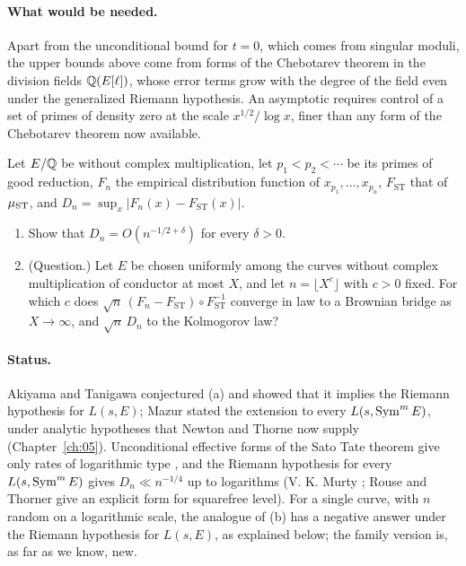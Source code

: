 \paragraph{What would be needed.} Apart from the unconditional bound for $t=0$, which comes from singular moduli, the upper bounds above come from forms of the Chebotarev theorem in the division fields $\mathbb{Q}(E[\ell])$, whose error terms grow with the degree of the field even under the generalized Riemann hypothesis. An asymptotic requires control of a set of primes of density zero at the scale $x^{1/2}/\log x$, finer than any form of the Chebotarev theorem now available.

\begin{problem}\label{op:disc}
Let $E/\mathbb{Q}$ be without complex multiplication, let $p_1<p_2<\cdots$ be its primes of good reduction, $F_n$ the empirical distribution function of $x_{p_1},\dots,x_{p_n}$, $F_{\mathrm{ST}}$ that of $\mu_{\mathrm{ST}}$, and $D_n=\sup_x|F_n(x)-F_{\mathrm{ST}}(x)|$.
\begin{enumerate}[label=(\alph*)]
\item Show that $D_n=O(n^{-1/2+\delta})$ for every $\delta>0$.
\item (Question.) Let $E$ be chosen uniformly among the curves without complex multiplication of conductor at most $X$, and let $n=\lfloor X^c\rfloor$ with $c>0$ fixed. For which $c$ does $\sqrt n\,(F_n-F_{\mathrm{ST}})\circ F_{\mathrm{ST}}^{-1}$ converge in law to a Brownian bridge as $X\to\infty$, and $\sqrt n\,D_n$ to the Kolmogorov law?
\end{enumerate}
\end{problem}

\paragraph{Status.} Akiyama and Tanigawa \cite{akiyamatanigawa1999} conjectured (a) and showed that it implies the Riemann hypothesis for $L(s,E)$; Mazur \cite{mazur2008} stated the extension to every $L(s,\operatorname{Sym}^mE)$, under analytic hypotheses that Newton and Thorne now supply (Chapter~\ref{ch:05}). Unconditional effective forms of the Sato Tate theorem give only rates of logarithmic type \cite{thorner2021}, and the Riemann hypothesis for every $L(s,\operatorname{Sym}^mE)$ gives $D_n\ll n^{-1/4}$ up to logarithms (V. K. Murty \cite{murty1985}; Rouse and Thorner \cite{rousethorner2017} give an explicit form for squarefree level). For a single curve, with $n$ random on a logarithmic scale, the analogue of (b) has a negative answer under the Riemann hypothesis for $L(s,E)$, as explained below; the family version is, as far as we know, new.

